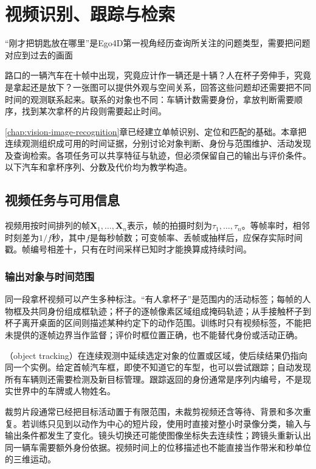 \chapter{视频识别、跟踪与检索}
\label{chap:vision-video-recognition}

“刚才把钥匙放在哪里”是Ego4D第一视角经历查询所关注的问题类型，需要把问题对应到过去的画面

路口的一辆汽车在十帧中出现，究竟应计作一辆还是十辆？人在杯子旁伸手，究竟是拿起还是放下？一张图可以提供外观与空间关系，回答这些问题却还需要把不同时间的观测联系起来。联系的对象也不同：车辆计数需要身份，拿放判断需要顺序，找到某次拿杯的片段则需要起止时间。

\ref{chap:vision-image-recognition}章已经建立单帧识别、定位和匹配的基础。本章把连续观测组织成可用的时间证据，分别讨论对象判断、身份与范围维护、活动发现及查询检索。各项任务可以共享特征与轨迹，但必须保留自己的输出与评价条件。以下汽车和拿杯序列、分数及代价均为教学构造。

\section{视频任务与可用信息}
\label{sec:vision-video-information}

视频用按时间排列的帧$\bm{X}_1,\ldots,\bm{X}_n$表示，帧的拍摄时刻为$\tau_1,\ldots,\tau_n$。等帧率时，相邻时刻差为$1/f$秒，其中$f$是每秒帧数；可变帧率、丢帧或抽样后，应保存实际时间戳。帧编号相差十，只有在时间采样已知时才能换算成持续时间。

\subsection{输出对象与时间范围}
\label{sec:vision-video-outputs}

同一段拿杯视频可以产生多种标注。“有人拿杯子”是范围内的活动标签；每帧的人物框及共同身份组成框轨迹；杯子的逐帧像素区域组成掩码轨迹；从手接触杯子到杯子离开桌面的区间则描述某种约定下的动作范围。训练时只有视频标签，不能把未提供的逐帧边界当作监督；评价时框位置正确，也不能替代身份或活动正确。

（object tracking）在连续观测中延续选定对象的位置或区域，使后续结果仍指向同一个实例。给定首帧汽车框，即使不知道它的车型，也可以尝试跟踪；自动发现所有车辆则还需要检测及新目标管理。跟踪返回的身份通常是序列内编号，不是现实世界中的车牌或人物姓名。

裁剪片段通常已经把目标活动置于有限范围，未裁剪视频还含等待、背景和多次重复。若训练只见到以动作为中心的短片段，使用时直接对整小时录像分类，输入与输出条件都发生了变化。镜头切换还可能使图像坐标失去连续性；跨镜头重新认出同一辆车需要额外身份依据。视频时间上的位移描述也不能直接当作带米和秒单位的三维运动。

